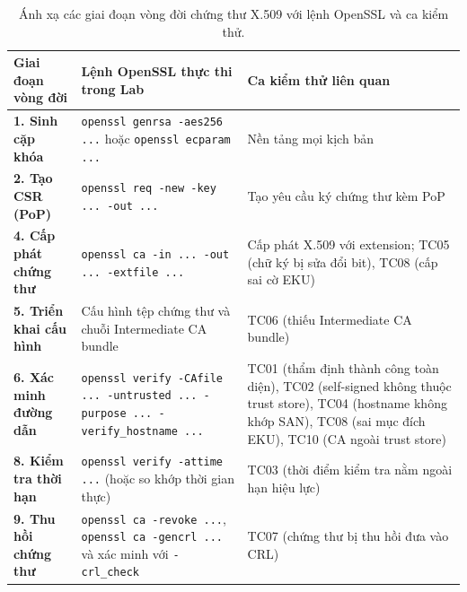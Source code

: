 \begin{table}[!htbp]
\centering
\small
\renewcommand{\arraystretch}{1.25}
\begin{tabularx}{\textwidth}{>{\raggedright\arraybackslash}p{2.6cm}>{\raggedright\arraybackslash}p{5.5cm}>{\raggedright\arraybackslash}X}
\toprule
\textbf{Giai đoạn vòng đời} & \textbf{Lệnh OpenSSL thực thi trong Lab} & \textbf{Ca kiểm thử liên quan} \\
\midrule
\textbf{1. Sinh cặp khóa} & \texttt{openssl genrsa -aes256 ...} hoặc \texttt{openssl ecparam ...} & Nền tảng mọi kịch bản \\
\midrule
\textbf{2. Tạo CSR (PoP)} & \texttt{openssl req -new -key ... -out ...} & Tạo yêu cầu ký chứng thư kèm PoP \\
\midrule
\textbf{4. Cấp phát chứng thư} & \texttt{openssl ca -in ... -out ... -extfile ...} & Cấp phát X.509 với extension; TC05 (chữ ký bị sửa đổi bit), TC08 (cấp sai cờ EKU) \\
\midrule
\textbf{5. Triển khai cấu hình} & Cấu hình tệp chứng thư và chuỗi Intermediate CA bundle & TC06 (thiếu Intermediate CA bundle) \\
\midrule
\textbf{6. Xác minh đường dẫn} & \texttt{openssl verify -CAfile ... -untrusted ... -purpose ... -verify\_hostname ...} & TC01 (thẩm định thành công toàn diện), TC02 (self-signed không thuộc trust store), TC04 (hostname không khớp SAN), TC08 (sai mục đích EKU), TC10 (CA ngoài trust store) \\
\midrule
\textbf{8. Kiểm tra thời hạn} & \texttt{openssl verify -attime ...} (hoặc so khớp thời gian thực) & TC03 (thời điểm kiểm tra nằm ngoài hạn hiệu lực) \\
\midrule
\textbf{9. Thu hồi chứng thư} & \texttt{openssl ca -revoke ...}, \texttt{openssl ca -gencrl ...} và xác minh với \texttt{-crl\_check} & TC07 (chứng thư bị thu hồi đưa vào CRL) \\
\bottomrule
\end{tabularx}
\caption{Ánh xạ các giai đoạn vòng đời chứng thư X.509 với lệnh OpenSSL và ca kiểm thử.}
\label{tab:lifecycle-openssl-tc}
\end{table}
